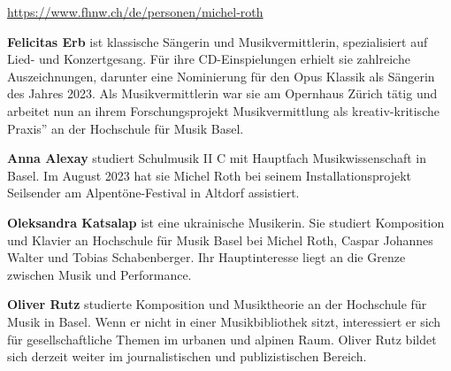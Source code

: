 \documentclass[a4paper,
fontsize=11pt,
oneside,
numbers=noperiodatend,
parskip=half-,
bibliography=totoc,
final
]{scrartcl}
\begin{document}
\url{https://www.fhnw.ch/de/personen/michel-roth}

\textbf{Felicitas Erb} ist klassische Sängerin und Musikvermittlerin,
spezialisiert auf Lied- und Konzertgesang. Für ihre CD-Einspielungen
erhielt sie zahlreiche Auszeichnungen, darunter eine Nominierung für den
Opus Klassik als Sängerin des Jahres 2023. Als Musikvermittlerin war sie
am Opernhaus Zürich tätig und arbeitet nun an ihrem Forschungsprojekt
Musikvermittlung als kreativ-kritische Praxis'' an der Hochschule für
Musik Basel.

\textbf{Anna Alexay} studiert Schulmusik II C mit Hauptfach
Musikwissenschaft in Basel. Im August 2023 hat sie Michel Roth bei
seinem Installationsprojekt Seilsender am Alpentöne-Festival in Altdorf
assistiert.

\textbf{Oleksandra Katsalap} ist eine ukrainische Musikerin. Sie
studiert Komposition und Klavier an Hochschule für Musik Basel bei
Michel Roth, Caspar Johannes Walter und Tobias Schabenberger. Ihr
Hauptinteresse liegt an die Grenze zwischen Musik und Performance.

\textbf{Oliver Rutz} studierte Komposition und Musiktheorie an der
Hochschule für Musik in Basel. Wenn er nicht in einer Musikbibliothek
sitzt, interessiert er sich für gesellschaftliche Themen im urbanen und
alpinen Raum. Oliver Rutz bildet sich derzeit weiter im journalistischen
und publizistischen Bereich.
\end{document}
